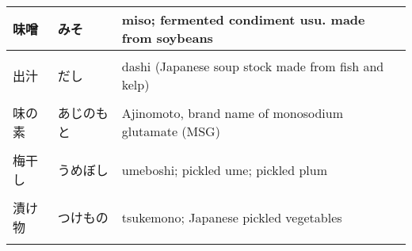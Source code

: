 \documentclass{article}
\begin{document}
\begin{tabular}{ l | l | p{11.5cm} }
味噌            &みそ                           &miso; fermented condiment usu. made from soybeans  \\ \hline \\[-1em]
出汁            &だし                           &dashi (Japanese soup stock made from fish and kelp) \\ \hline \\[-1em]
味の素          &あじのもと                     &Ajinomoto, brand name of monosodium glutamate (MSG) \\ \hline \\[-1em]
梅干し          &うめぼし                       &umeboshi; pickled ume; pickled plum  \\ \hline \\[-1em]												%
漬け物          &つけもの                       &tsukemono; Japanese pickled vegetables  \\ \hline \\[-1em]
\end{tabular}
\end{document}
